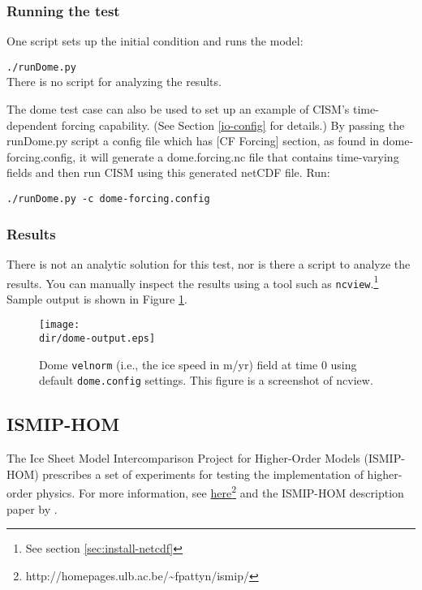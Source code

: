 \subsubsection{Running the test}
One script sets up the initial condition and runs the model:

\texttt{./runDome.py}\\

\noindent
There is no script for analyzing the results.

\par
The dome test case can also be used to set up an example of CISM's time-dependent
forcing capability.  (See Section \ref{io-config} for details.) By passing the runDome.py script a config file which has [CF Forcing] section, as found in dome-forcing.config,
it will generate a dome.forcing.nc file that contains time-varying fields and then run CISM using this generated netCDF file. Run:


\texttt{./runDome.py -c dome-forcing.config}\\


\subsubsection{Results}
There is not an analytic solution for this test, nor is there a script to analyze
the results.  You can manually inspect the results using a tool such as \texttt{ncview}.\footnote{See section \ref{sec:install-netcdf}}
Sample output is shown in Figure \ref{fig:domeresults}.
\begin{figure}[H]
	\centering
	\texttt{[image: \\dir/dome-output.eps]}
	\caption{Dome \texttt{velnorm} (i.e., the ice speed in m/yr) field at time 0 using default \texttt{dome.config} settings. This figure is a screenshot of ncview.}
	\label{fig:domeresults}
\end{figure}
\FloatBarrier

\subsection{ISMIP-HOM}
The Ice Sheet Model Intercomparison Project for Higher-Order Models (ISMIP-HOM)
prescribes a set of experiments for testing the implementation of higher-order physics.  
For more information, see 
\href{http://homepages.ulb.ac.be/~fpattyn/ismip/}{here}\footnote{http://homepages.ulb.ac.be/\textasciitilde{}fpattyn/ismip/} 
and the ISMIP-HOM description paper by \citet{Pattyn2008}.


